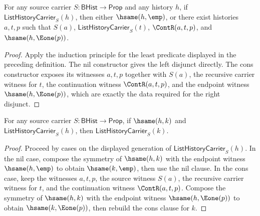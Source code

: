 \begin{theorem}
\label{thm:list-history-carrier-generated-cases}
For any source carrier $S:\mathsf{BHist}\to\mathsf{Prop}$ and any history $h$, if $\mathsf{ListHistoryCarrier}_S(h)$, then either $\hsame(h,\emp)$, or there exist histories $a,t,p$ such that $S(a)$, $\mathsf{ListHistoryCarrier}_S(t)$, $\ContR(a,t,p)$, and $\hsame(h,\Eone(p))$.
\end{theorem}
\begin{proof}
Apply the induction principle for the least predicate displayed in the preceding definition. The nil constructor gives the left disjunct directly. The cons constructor exposes its witnesses $a,t,p$ together with $S(a)$, the recursive carrier witness for $t$, the continuation witness $\ContR(a,t,p)$, and the endpoint witness $\hsame(h,\Eone(p))$, which are exactly the data required for the right disjunct.
\end{proof}

\begin{theorem}
\label{thm:list-history-carrier-hsame-transport}
For any source carrier $S:\mathsf{BHist}\to\mathsf{Prop}$, if $\hsame(h,k)$ and $\mathsf{ListHistoryCarrier}_S(h)$, then $\mathsf{ListHistoryCarrier}_S(k)$.
\end{theorem}
\begin{proof}
Proceed by cases on the displayed generation of $\mathsf{ListHistoryCarrier}_S(h)$. In the nil case, compose the symmetry of $\hsame(h,k)$ with the endpoint witness $\hsame(h,\emp)$ to obtain $\hsame(k,\emp)$, then use the nil clause. In the cons case, keep the witnesses $a,t,p$, the source witness $S(a)$, the recursive carrier witness for $t$, and the continuation witness $\ContR(a,t,p)$. Compose the symmetry of $\hsame(h,k)$ with the endpoint witness $\hsame(h,\Eone(p))$ to obtain $\hsame(k,\Eone(p))$, then rebuild the cons clause for $k$.
\end{proof}

